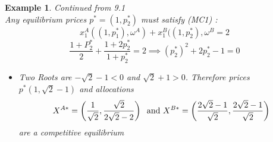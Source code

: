 \documentclass[twoside]{article}
\newtheorem{ex}[theorem]{Example}
\begin{document}
\begin{ex} Continued from 9.1\\
Any equilibrium prices \(p^* = (1, p_2^*)\) must satisfy (MC1) : 
\[x_1^A ((1, p_1^*), \omega^A) + x_1^B((1, p_2^*), \omega^{B} = 2 \]
\[\frac{1 + P_2^* }{2 } + \frac{1+2p_2^*}{1 + p_2^*} = 2 \implies (p_2^*)^2 + 2 p_2^* - 1 = 0 \]
\begin{itemize}
\item Two Roots are \(-\sqrt{2} - 1 < 0\) and \(\sqrt{2} + 1 > 0\). Therefore prices \(p^*(1, \sqrt{2} -1)\) and allocations 
\[X^{A*} = \left(\frac{1}{\sqrt{2}}, \frac{\sqrt{2}}{2 \sqrt{2} - 2} \right) \hspace{0.2cm} \text{and } X^{B*} = \left(\frac{2 \sqrt{2} - 1}{\sqrt{2}}, \frac{2 \sqrt{2} - 1}{\sqrt{2}} \right)\]
are a competitive equilibrium
\end{itemize}
\end{ex}
\end{document}
